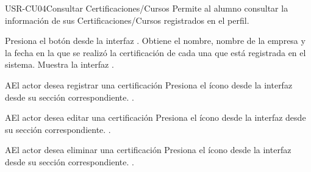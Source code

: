 \begin{UseCase}[]{USR-CU04}{Consultar Certificaciones/Cursos}{
	Permite al alumno consultar la información de sus Certificaciones/Cursos registrados en el perfil.
}
\end{UseCase}

\begin{UCtrayectoria}
	\UCpaso [\UCactor] Presiona el botón  desde la interfaz .
    \UCpaso [\UCsist] Obtiene el nombre, nombre de la empresa y la fecha en la que se realizó la certificación de cada una que está registrada en el sistema.
	\UCpaso [\UCsist] Muestra la interfaz .
\end{UCtrayectoria}

\begin{UCtrayectoriaA}{A}{El actor desea registrar una certificación}
	\UCpaso [\UCsist] Presiona el ícono \IUAgregar{} desde la interfaz  desde su sección correspondiente.
	.
\end{UCtrayectoriaA} 

\begin{UCtrayectoriaA}{A}{El actor desea editar una certificación}
	\UCpaso [\UCsist] Presiona el ícono \IUEditar{} desde la interfaz  desde su sección correspondiente.
	.
\end{UCtrayectoriaA} 

\begin{UCtrayectoriaA}{A}{El actor desea eliminar una certificación}
	\UCpaso [\UCsist] Presiona el ícono \IUEliminar{} desde la interfaz  desde su sección correspondiente.
	.
\end{UCtrayectoriaA} 